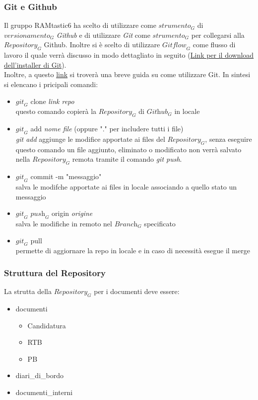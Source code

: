 \subsubsection{Git e Github}
Il gruppo RAMtastic6 ha scelto di utilizzare come $\textit{strumento}_G$ di $\textit{versionamento}_G$ \emph{Github} e di utilizzare \emph{Git} come $\textit{strumento}_G$ per collegarsi alla $\textit{Repository}_G$ Github.
Inoltre si è scelto di utilizzare $\textit{Gitflow}_G$ come flusso di lavoro il quale verrà discusso in modo dettagliato in seguito
(\href{https://git-scm.com/downloads}{Link per il download dell'installer di Git}).\\
Inoltre, a questo \href{https://rogerdudler.github.io/git-guide/index.it.html}{link} si troverà una breve guida su come utilizzare Git.
In sintesi si elencano i pricipali comandi:
\begin{itemize}
    \item $\textit{git}_G$ clone \emph{link repo}\\
    questo comando copierà la $\textit{Repository}_G$ di $\textit{Github}_G$ in locale
    \item $\textit{git}_G$ add \emph{nome file} (oppure "." per includere tutti i file)\\
    \emph{git add} aggiunge le modifice apportate ai files del $\textit{Repository}_G$, senza eseguire questo comando un file aggiunto, eliminato o modificato non verrà salvato nella $\textit{Repository}_G$ remota tramite il comando \emph{git push}.
    \item $\textit{git}_G$ commit -m "messaggio" \\
    salva le modifche apportate ai files in locale associando a quello stato un messaggio
    \item $\textit{git}_G$ $\textit{push}_G$ origin \emph{origine} \\
    salva le modifiche in remoto nel $\textit{Branch}_G$ specificato
    \item $\textit{git}_G$ pull \\
    permette di aggiornare la repo in locale e in caso di necessità esegue il merge
\end{itemize}
\subsubsection{Struttura del Repository}
La strutta della $\textit{Repository}_G$ per i documenti deve essere:
\begin{itemize}
    \item documenti
    \begin{itemize}
        \item Candidatura
        \item RTB
        \item PB
    \end{itemize}
    \item diari\_di\_bordo
    \item documenti\_interni
\end{itemize}
